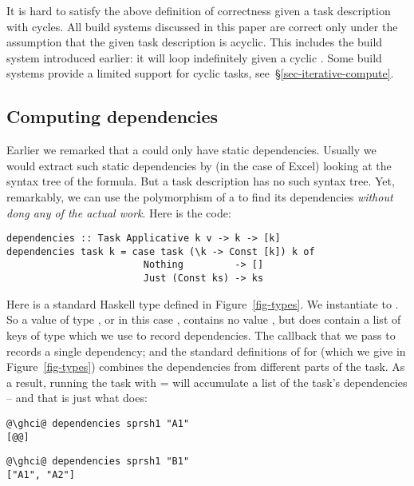 It is hard to satisfy the above definition of correctness given a task
description with cycles. All build systems discussed in this paper are correct
only under the assumption that the given task description is acyclic. This
includes the  build system introduced earlier: it will loop
indefinitely given a cyclic . Some build systems provide a limited
support for cyclic tasks, see~\S\ref{sec-iterative-compute}.

\subsection{Computing dependencies}\label{sec-deps}


Earlier we remarked that a  could only have static dependencies.
Usually we would extract such static dependencies by (in the case of Excel)
looking at the syntax tree of the formula.  But a task description has no
such syntax tree.  Yet, remarkably, we can use the polymorphism of a
 to find its dependencies \emph{without dong any of the actual work}.
Here is the code:
\vspace{1mm}
\begin{verbatim}
dependencies :: Task Applicative k v -> k -> [k]
dependencies task k = case task (\k -> Const [k]) k of
                        Nothing         -> []
                        Just (Const ks) -> ks
\end{verbatim}
\vspace{1mm}
Here  is a standard Haskell type defined in Figure~\ref{fig-types}.
We instantiate  to .  So a value of type ,
or in this case , contains no value , but does contain
a list of keys of type \hs{[k]} which we use to record dependencies.
The  callback that we pass to 
records a single dependency; and the standard definitions of 
for  (which we give in Figure~\ref{fig-types}) combines the
dependencies from different parts of the task.
As a result, running the task with  =  will accumulate a list of
the task's dependencies -- and that is just what  does:
\vspace{1mm}
\begin{verbatim}
@\ghci@ dependencies sprsh1 "A1"
[@@]
\end{verbatim}
\begin{verbatim}
@\ghci@ dependencies sprsh1 "B1"
["A1", "A2"]
\end{verbatim}
\vspace{1mm}

